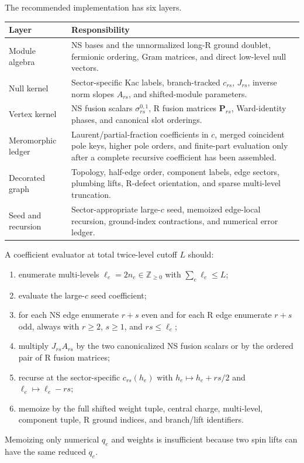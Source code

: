 \documentclass[11pt]{article}
\begin{document}
The recommended implementation has six layers.
\begin{center}
\begin{tabularx}{\textwidth}{@{}L{0.21\textwidth}X@{}}
\toprule
Layer & Responsibility\\
\midrule
Module algebra & NS bases and the unnormalized long-R ground doublet,
fermionic ordering, Gram matrices, and direct low-level null vectors.\\
Null kernel & Sector-specific Kac labels, branch-tracked $c_{rs}$,
$J_{rs}$, inverse norm slopes $A_{rs}$, and shifted-module parameters.\\
Vertex kernel & NS fusion scalars $\sigma_{rs}^{0,1}$, R fusion matrices
$\mathbf P_{rs}$, Ward-identity phases, and canonical slot orderings.\\
Meromorphic ledger & Laurent/partial-fraction coefficients in $c$, merged
coincident pole keys, higher pole orders, and finite-part evaluation only
after a complete recursive coefficient has been assembled.\\
Decorated graph & Topology, half-edge order, component labels, edge sectors,
plumbing lifts, R-defect orientation, and sparse multi-level truncation.\\
Seed and recursion & Sector-appropriate large-$c$ seed, memoized edge-local
recursion, ground-index contractions, and numerical error ledger.\\
\bottomrule
\end{tabularx}
\end{center}

A coefficient evaluator at total twice-level cutoff $L$ should:
\begin{enumerate}
 \item enumerate multi-levels $\ell_e=2n_e\in\mathbb Z_{\ge0}$ with
 $\sum_e\ell_e\le L$;
 \item evaluate the large-$c$ seed coefficient;
 \item for each NS edge enumerate $r+s$ even and for each R edge enumerate
 $r+s$ odd, always with $r\ge2$, $s\ge1$, and $rs\le\ell_e$;
 \item multiply $J_{rs}A_{rs}$ by the two canonicalized NS fusion scalars or
 by the ordered pair of R fusion matrices;
 \item recurse at the sector-specific $c_{rs}(h_e)$ with
 $h_e\mapsto h_e+rs/2$ and
 $\ell_e\mapsto\ell_e-rs$;
 \item memoize by the full shifted weight tuple, central charge, multi-level,
 component tuple, R ground indices, and branch/lift identifiers.
\end{enumerate}
Memoizing only numerical $q_e$ and weights is insufficient because two spin
lifts can have the same reduced $q_e$.
\end{document}
